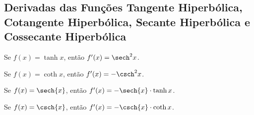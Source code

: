 \subsection{Derivadas das Funções Tangente Hiperbólica, Cotangente Hiperbólica, Secante Hiperbólica e Cossecante Hiperbólica}
\begin{frame}
  \begin{theorem}
    Se $f(x)=\tanh{x}$, então $f^{\prime}(x) = \sech^{2}{x}$.
  \end{theorem}
  \vfill
  \begin{theorem}
    Se $f(x)=\coth{x}$, então $f^{\prime}(x) = -\csch^{2}{x}$.
  \end{theorem}
  \vfill
  \begin{theorem}
    Se $f(x)=\sech{x}$, então $f^{\prime}(x) = -\sech{x}\cdot\tanh{x}$.
  \end{theorem}
  \vfill
  \begin{theorem}
    Se $f(x)=\csch{x}$, então $f^{\prime}(x) = -\csch{x}\cdot\coth{x}$.
  \end{theorem}
\end{frame}
